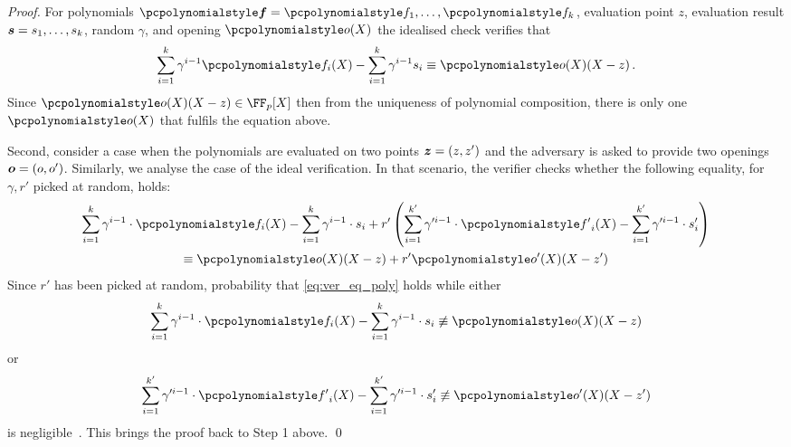 \documentclass[runningheads,11pt]{llncs}
\def\vec#1{\mathchoice{\mbox{\boldmath$\displaystyle#1$}}
{\mbox{\boldmath$\textstyle#1$}} {\mbox{\boldmath$\scriptstyle#1$}}
{\mbox{\boldmath$\scriptscriptstyle#1$}}}
\theoremstyle{definition} \newtheorem{definition}[theorem]{Definition}
\begin{document}
\begin{proof}
For polynomials $\vec{\p{f}} = \p{f}_1, \ldots, \p{f}_k$, evaluation point $z$, evaluation
result $\vec{s} = s_1, \ldots, s_k$, random $\gamma$, and opening $\p{o}(X)$ the
idealised check verifies that
\begin{equation}
	\sum_{i = 1}^k \gamma^{i - 1} \p{f}_i(X) - \sum_{i = 1}^{k} \gamma^{i - 1} s_i \equiv \p{o}(X) (X - z)\,.
	\label{eq:pcom_idealised_check}
\end{equation}
Since $\p{o}(X)(X - z) \in \FF_p[X]$ then from the uniqueness of polynomial
composition, there is only one $\p{o} (X)$ that fulfils the equation above.

 Second, consider a case when the polynomials are evaluated on two
points $\vec{z} = (z, z')$ and the adversary is asked to provide two openings
$\vec{o} = (o, o')$. Similarly, we analyse the case of the ideal verification.
In that scenario, the verifier checks whether the following equality, for
$\gamma, r'$ picked at random, holds:
\begin{multline}
	\label{eq:ver_eq_poly}
	\sum_{i = 1}^{k} \gamma^{i - 1} \cdot \p{f}_i(X) - \sum_{i = 1}^{k} \gamma^{i - 1} \cdot s_i  + r' \left(\sum_{i = 1}^{k'} \gamma'^{i - 1} \cdot \p{f'}_i(X) - \sum_{i = 1}^{k'} \gamma'^{i - 1} \cdot s'_i \right)\\
	\equiv \p{o}(X)(X - z) + r' \p{o}'(X)(X- z')
\end{multline}
Since $r'$ has been picked at random, probability that \cref{eq:ver_eq_poly} holds while either
\[
	\sum_{i = 1}^{k} \gamma^{i - 1} \cdot \p{f}_i(X) - \sum_{i = 1}^{k}  \gamma^{i - 1} \cdot s_i \not\equiv \p{o}(X)(X - z)
\]
or 
\[
	\sum_{i = 1}^{k'} \gamma'^{i - 1} \cdot \p{f'}_i(X) - \sum_{i = 1}^{k'} \gamma'^{i - 1} \cdot s'_i \not\equiv \p{o'}(X)(X - z')
\]
is negligible~\cite{EPRINT:GabWilCio19}. This brings the proof back to
Step 1 above. \qed
\end{proof}
\end{document}
